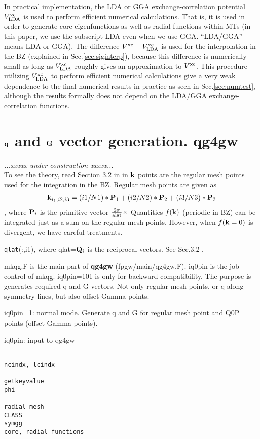 \documentclass[a4paper,10pt,epsf,fleqn]{article}
\def\vxc{V^{\rm xc}}
\def\bfP{{\bf P}}
\def\underconstruction{{\it...xxxxx under construction xxxxx...\\}}
\newcommand{\bfq}{{\bf q}}
\newcommand{\bfk}{{\bf k}}
\newcommand{\bfQ}{{\bf Q}}
\newcommand{\bfG}{{\bf G}}
\newcommand{\exe}[1]{{\bf #1}}
\newcommand{\raw}[1]{{\tt #1}}
\newcommand{\qlat}{{\raw{qlat}}}
\begin{document}
In practical implementation, the LDA or GGA exchange-correlation
potential $V^{\rm xc}_{\rm LDA}$ is used to perform efficient numerical calculations.
That is, it is used in order to generate core eigenfunctions as well as radial functions within MTs
(in this paper, we use the subscript LDA even when we use GGA. ``LDA/GGA'' means LDA or GGA).
The difference $\vxc-V^{\rm xc}_{\rm LDA}$ is used 
for the interpolation in the BZ (explained in Sec.\ref{sec:siginterp}),
because this difference is numerically small as long as 
$V^{\rm xc}_{\rm LDA}$ roughly gives an approximation to $\vxc$.
This procedure utilizing $V^{\rm xc}_{\rm LDA}$ to perform efficient numerical calculations
give a very weak dependence to the final numerical results in practice as seen in Sec.\ref{sec:numtest},
although the results formally does not depend on the LDA/GGA exchange-correlation functions.


\section{$\bfq$ and $\bfG$ vector generation. qg4gw}
\underconstruction
To see the theory, read Section 3.2 in in \cite{kotani_quasiparticle_2014}
$\bfk$ points are the regular mesh points used for the integration
in the BZ. Regular mesh points are given as
\begin{eqnarray}
\bfk_{i_1,i2,i3}=(i1/N1)*\bfP_1+(i2/N2)*\bfP_2+(i3/N3)*\bfP_3
\end{eqnarray}
, where $\bfP_i$ is the primitive vector $\frac{2\pi}{\rm alat} \times$
Quantities $f(\bfk)$ (periodic in BZ) can
be integrated just as a sum on the regular mesh points.
However, when  $f(\bfk=0)$ is divergent, we have careful treatments.

\qlat(:,i1), where qlat=$\bfQ_i$ is the reciprocal vectors.
See Sec.3.2 .

mkqg.F is the main part of \exe{qg4gw} (fpgw/main/qg4gw.F).
iq0pin is the job control of mkqg. iq0pin=101 is only for backward compatibility. 
The purpose is generates required q and G vectors.
Not only regular mesh points, or q along symmetry lines, 
but also offset Gamma points.

iq0pin=1: normal mode. Generate q and G for regular mesh point and Q0P
points (offset Gamma points).

iq0pin: input to qg4gw

\begin{verbatim}

ncindx, lcindx

getkeyvalue
phi

radial mesh
CLASS
symgg
core, radial functions

\end{verbatim}
\end{document}
